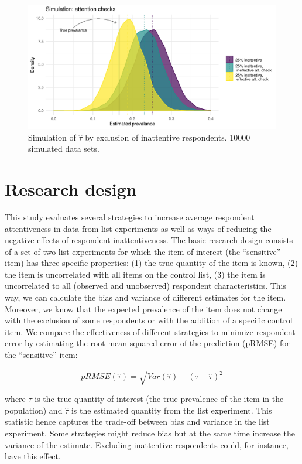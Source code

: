 \documentclass[]{article}
\begin{document}
\begin{figure}
\centering
\includegraphics[width=6.25in,height=\textheight]{output/estimates_attention_checks_color.pdf}
\caption{Simulation of \(\hat{\tau}\) by exclusion of inattentive
respondents. 10000 simulated data sets. \label{sim_excluded}}
\end{figure}

\hypertarget{research-design}{%
\section{Research design}\label{research-design}}

This study evaluates several strategies to increase average respondent
attentiveness in data from list experiments as well as ways of reducing
the negative effects of respondent inattentiveness. The basic research
design consists of a set of two list experiments for which the item of
interest (the ``sensitive'' item) has three specific properties: (1) the
true quantity of the item is known, (2) the item is uncorrelated with
all items on the control list, (3) the item is uncorrelated to all
(observed and unobserved) respondent characteristics. This way, we can
calculate the bias and variance of different estimates for the item.
Moreover, we know that the expected prevalence of the item does not
change with the exclusion of some respondents or with the addition of a
specific control item. We compare the effectiveness of different
strategies to minimize respondent error by estimating the root mean
squared error of the prediction (pRMSE) for the ``sensitive'' item:

\[
pRMSE(\hat{\tau}) = \sqrt{Var(\hat{\tau}) + (\tau - \hat{\tau})^2}
\]

\noindent where \(\tau\) is the true quantity of interest (the true
prevalence of the item in the population) and \(\hat{\tau}\) is the
estimated quantity from the list experiment. This statistic hence
captures the trade-off between bias and variance in the list experiment.
Some strategies might reduce bias but at the same time increase the
variance of the estimate. Excluding inattentive respondents could, for
instance, have this effect.
\end{document}
